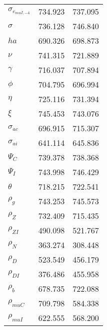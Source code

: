 \begin{center}
\begin{longtable}{lcc}
$ \sigma_{{e_{muI,-4}}}   $	 & 	     734.923	 & 	     737.095 \\ 
$ {\sigma}                $	 & 	     736.128	 & 	     746.840 \\ 
$ {ha}                    $	 & 	     690.326	 & 	     698.873 \\ 
$ \nu                     $	 & 	     741.315	 & 	     721.889 \\ 
$ \gamma                  $	 & 	     716.037	 & 	     707.894 \\ 
$ {\phi}                  $	 & 	     704.795	 & 	     696.994 \\ 
$ {\eta}                  $	 & 	     725.116	 & 	     731.394 \\ 
$ \xi                     $	 & 	     745.453	 & 	     743.076 \\ 
$ {\sigma_{ac}}           $	 & 	     696.915	 & 	     715.307 \\ 
$ {\sigma_{ai}}           $	 & 	     641.114	 & 	     645.836 \\ 
$ {\Psi_{C}}              $	 & 	     739.378	 & 	     738.368 \\ 
$ {\Psi_I}                $	 & 	     743.998	 & 	     746.429 \\ 
$ {\theta}                $	 & 	     718.215	 & 	     722.541 \\ 
$ {\rho_g}                $	 & 	     743.253	 & 	     745.573 \\ 
$ {\rho_Z}                $	 & 	     732.409	 & 	     715.435 \\ 
$ {\rho_{ZI}}             $	 & 	     490.098	 & 	     521.767 \\ 
$ {\rho_N}                $	 & 	     363.274	 & 	     308.448 \\ 
$ {\rho_D}                $	 & 	     523.549	 & 	     456.179 \\ 
$ {\rho_{DI}}             $	 & 	     376.486	 & 	     455.958 \\ 
$ {\rho_b}                $	 & 	     678.735	 & 	     722.088 \\ 
$ {\rho_{muC}}            $	 & 	     709.798	 & 	     584.338 \\ 
$ {\rho_{muI}}            $	 & 	     622.555	 & 	     568.200 \\ 
\end{longtable}
 \end{center}
